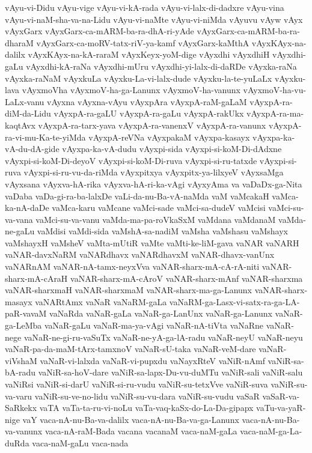 {vAyu-vi-Didu
vAyu-vige
vAyu-vi-kA-rada
vAyu-vi-lalx-di-dadxre
vAyu-vina
vAyu-vi-naM-sha-va-na-Lidu
vAyu-vi-naMte
vAyu-vi-niMda
vAyuvu
vAyw
vAyx
vAyxGarx
vAyxGarx-ca-mARM-ba-ra-dhA-ri-yAde
vAyxGarx-ca-mARM-ba-ra-dharaM
vAyxGarx-ca-moRV-tatx-riV-ya-kamf
vAyxGarx-kaMthA
vAyxKAyx-na-dalilx
vAyxKAyx-na-kA-raraM
vAyxKeyx-yoM-dige
vAyxdhi
vAyxdhiH
vAyxdhi-gaLu
vAyxdhi-kA-raNa
vAyxdhi-mUru
vAyxdhi-yi-lalx-di-daRDe
vAyxka-raNa
vAyxka-raNaM
vAyxkuLa
vAyxku-La-vi-lalx-dude
vAyxku-la-te-yuLaLx
vAyxku-lava
vAyxmoVha
vAyxmoV-ha-ga-Lanunx
vAyxmoV-ha-vanunx
vAyxmoV-ha-vu-LaLx-vanu
vAyxna
vAyxna-vAyu
vAyxpAra
vAyxpA-raM-gaLaM
vAyxpA-ra-diM-da-Lidu
vAyxpA-ra-gaLU
vAyxpA-ra-gaLu
vAyxpA-rakUkx
vAyxpA-ra-ma-kaqtAvx
vAyxpA-ra-tarx-yava
vAyxpA-ra-vanenxV
vAyxpA-ra-vanunx
vAyxpA-ra-vi-mu-Ka-te-yiMda
vAyxpA-reVNa
vAyxpakaM
vAyxpa-kasayx
vAyxpa-ka-vA-du-dA-gide
vAyxpa-ka-vA-dudu
vAyxpi-sida
vAyxpi-si-koM-Di-dAdxne
vAyxpi-si-koM-Di-deyoV
vAyxpi-si-koM-Di-ruva
vAyxpi-si-ru-tatxde
vAyxpi-si-ruva
vAyxpi-si-ru-vu-da-riMda
vAyxpitxya
vAyxpitx-ya-lilxyeV
vAyxsaMga
vAyxsana
vAyxva-hA-rika
vAyxva-hA-ri-ka-vAgi
vAyxyAma
va
vaDaDx-ga-Nita
vaDaba
vaDa-gi-ra-ba-lalxDe
vaLi-da-nu-Ba-vA-naMda
vaM
vaMcakaH
vaMca-ka-nA-daDe
vaMca-karu
vaMcane
vaMci-sade
vaMci-sa-dudeV
vaMcisi
vaMci-su-va-vana
vaMci-su-va-vanu
vaMda-ma-pa-roVkaSxM
vaMdana
vaMdanaM
vaMda-ne-gaLu
vaMdisi
vaMdi-sida
vaMshA-sa-nadiM
vaMsha
vaMshasu
vaMshayx
vaMshayxH
vaMsheV
vaMta-mUtiR
vaMte
vaMti-ke-liM-gava
vaNAR
vaNARH
vaNAR-davxNaRM
vaNARdhavx
vaNARdhavxM
vaNAR-dhavx-vanUnx
vaNARnAM
vaNAR-nA-tamx-neyxVva
vaNAR-sharx-mA-cA-rA-niti
vaNAR-sharx-mA-cAraH
vaNAR-sharx-mA-cAroV
vaNAR-sharx-mAnf
vaNAR-sharxma
vaNAR-sharxmaH
vaNAR-sharxmaM
vaNAR-sharx-ma-ga-Lanunx
vaNAR-sharx-masayx
vaNARtAmx
vaNaR
vaNaRM-gaLa
vaNaRM-ga-Lasx-vi-satx-ra-ga-LA-paR-vavaM
vaNaRda
vaNaR-gaLa
vaNaR-ga-LanUnx
vaNaR-ga-Lanunx
vaNaR-ga-LeMba
vaNaR-gaLu
vaNaR-ma-ya-vAgi
vaNaR-nA-tiVta
vaNaRne
vaNaR-nege
vaNaR-ne-gi-ru-vaSuTx
vaNaR-ne-yA-ga-lA-radu
vaNaR-neyU
vaNaR-neyu
vaNaR-pa-da-maM-tArx-tamxnoV
vaNaR-sU-taka
vaNaR-veM-dare
vaNaR-viVshaM
vaNaR-vi-lalxda
vaNaR-vi-pupxdu
vaNayxRteV
vaNiR-nAmf
vaNiR-sa-bA-radu
vaNiR-sa-hoV-dare
vaNiR-sa-lapx-Du-vu-duMTu
vaNiR-sali
vaNiR-salu
vaNiRsi
vaNiR-si-darU
vaNiR-si-ru-vudu
vaNiR-su-tetxVve
vaNiR-suva
vaNiR-su-va-varu
vaNiR-su-ve-no-lidu
vaNiR-su-vu-dara
vaNiR-su-vudu
vaSaR
vaSaR-va-SaRkekx
vaTA
vaTa-ta-ru-vi-noLu
vaTa-vaq-kaSx-do-La-Da-gipapx
vaTu-va-yaR-nige
vaY
vaca-nA-nu-Ba-va-dalilx
vaca-nA-nu-Ba-va-ga-Lanunx
vaca-nA-nu-Ba-va-vanunx
vaca-nA-raM-Bada
vacana
vacanaM
vaca-naM-gaLa
vaca-naM-ga-La-duRda
vaca-naM-gaLu
vaca-nada
}
